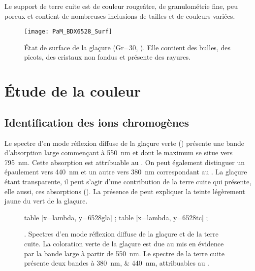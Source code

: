 Le support de terre cuite est de couleur rougeâtre, de granulométrie 
fine, peu poreux et contient de nombreuses inclusions de tailles et 
de couleurs variées.

\begin{figure}[htb]
  \texttt{[image: PaM\_BDX6528\_Surf]}
  \caption[\ -- État de surface de la glaçure]
          {\legendeA 
           État de surface de la glaçure (Gr=30, ). Elle contient des 
           bulles, des picots, des cristaux non fondus et présente 
           des rayures.}
  \label{surf:6528}
\end{figure}


\section{Étude de la couleur}

\subsection{Identification des ions chromogènes}
Le spectre d'\AO en mode réflexion diffuse de la glaçure verte 
() présente une bande d'absorption large commençant 
à \SI{550}{nm} et dont le maximum se situe vers \SI{795}{nm}. Cette 
absorption est attribuable au  \autocite{Lajarte_1979}. On 
peut également distinguer un épaulement vers \SI{440}{nm} et un autre 
vers \SI{380}{nm} correspondant au . La glaçure étant 
transparente, il peut s'agir d'une contribution de la terre cuite 
qui présente, elle aussi, ces absorptions (). 
La présence de  peut expliquer la teinte légèrement jaune 
du vert de la glaçure.

\begin{figure}[htb]
  \begin{plotspectre}
       table [x=lambda, y=6528gla] {\gladata} ;
       table [x=lambda, y=6528tc] {\tcdata} ;
  \end{plotspectre}
  \caption[\ -- Spectres d'\AO en mode réflexion diffuse 
           de la glaçure et de la terre cuite]
          {\legendeA.
           Spectres d'\AO en mode réflexion diffuse de la glaçure et 
           de la terre cuite. La coloration verte de la glaçure est 
           due au  mis en évidence par la bande large à 
           partir de \SI{550}{\nm}. Le spectre de la terre cuite 
           présente deux bandes à \SIlist{380;440}{\nm}, attribuables 
           au  \autocite{Lajarte_1979}.}
  \label{spectre:6528}
\end{figure}

